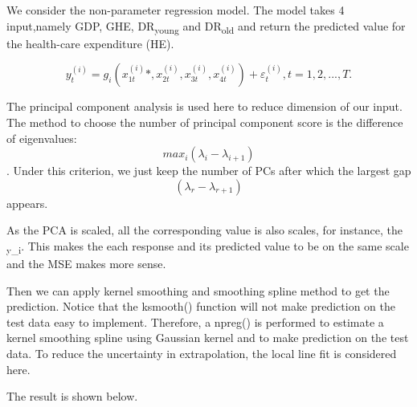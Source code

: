 \documentclass[
]{article}
\begin{document}
We consider the non-parameter regression model. The model takes 4
input,namely GDP, GHE, DR\textsubscript{young} and DR\textsubscript{old}
and return the predicted value for the health-care expenditure (HE).

\[
y^{(i)}_t = g_i(x^{(i)}_{1t}*,x^{(i)}_{2t}, x^{(i)}_{3t}, x^{(i)}_{4t})+ ε^{(i)}_t, t = 1, 2, . . . , T.
\]

The principal component analysis is used here to reduce dimension of our
input. The method to choose the number of principal component score is
the difference of eigenvalues: \[max_i (\lambda_i-\lambda_{i+1})\].
Under this criterion, we just keep the number of PCs after which the
largest gap \[(\lambda_r-\lambda_{r+1})\] appears.

As the PCA is scaled, all the corresponding value is also scales, for
instance, the \textsubscript{y\_i}. This makes the each response and its
predicted value to be on the same scale and the MSE makes more sense.

Then we can apply kernel smoothing and smoothing spline method to get
the prediction. Notice that the ksmooth() function will not make
prediction on the test data easy to implement. Therefore, a npreg() is
performed to estimate a kernel smoothing spline using Gaussian kernel
and to make prediction on the test data. To reduce the uncertainty in
extrapolation, the local line fit is considered here.

The result is shown below.
\end{document}
